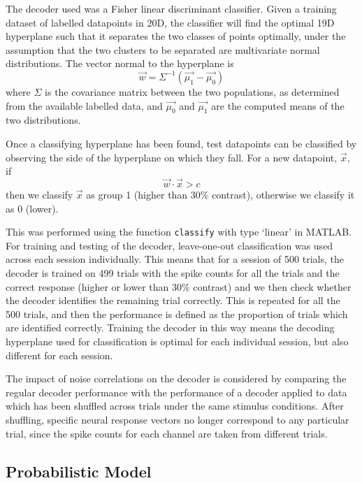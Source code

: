 The decoder used was a Fisher linear discriminant classifier. Given a training dataset of labelled datapoints in 20D, the classifier will find the optimal 19D hyperplane such that it separates the two classes of points optimally, under the assumption that the two clusters to be separated are multivariate normal distributions. The vector normal to the hyperplane is 
\begin{equation}
\vec{w} = \Sigma^{-1}\left(\vec{\mu_1}-\vec{\mu_0}\right)
\end{equation}
where $\Sigma$ is the covariance matrix between the two populations, as determined from the available labelled data, and $\vec{\mu_0}$ and $\vec{\mu_1}$ are the computed means of the two distributions.

Once a classifying hyperplane has been found, test datapoints can be classified by observing the side of the hyperplane on which they fall. For a new datapoint, $\vec{x}$,  if
\begin{equation}
\vec{w}\cdot\vec{x}>c
\end{equation}
then we classify $\vec{x}$ as group 1 (higher than 30\% contrast), otherwise we classify it as 0 (lower).

This was performed using the function \texttt{classify} with type `linear' in MATLAB. For training and testing of the decoder, leave-one-out classification was used across each session individually. This means that for a session of 500 trials, the decoder is trained on 499 trials with the spike counts for all the trials and the correct response (higher or lower than 30\% contrast) and we then check whether the decoder identifies the remaining trial correctly.
This is repeated for all the 500 trials, and then the performance is defined as the proportion of trials which are identified correctly. Training the decoder in this way means the decoding hyperplane used for classification is optimal for each individual session, but also different for each session.

The impact of noise correlations on the decoder is considered by comparing the regular decoder performance with the performance of a decoder applied to data which has been shuffled across trials under the same stimulus conditions. After shuffling, specific neural response vectors no longer correspond to any particular trial, since the spike counts for each channel are taken from different trials.

\subsection{Probabilistic Model}
\label{sec:dec-meth-prob}

